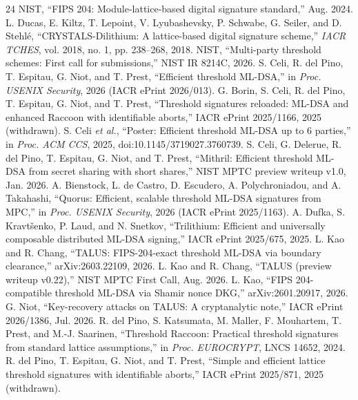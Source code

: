 \documentclass[10pt,conference,a4paper]{IEEEtran}
\begin{document}
\begin{thebibliography}{24}\footnotesize
{} NIST, ``FIPS 204: Module-lattice-based digital signature standard,'' Aug. 2024.
 L. Ducas, E. Kiltz, T. Lepoint, V. Lyubashevsky, P. Schwabe, G. Seiler, and D. Stehl\'e, ``CRYSTALS-Dilithium: A lattice-based digital signature scheme,'' \emph{IACR TCHES}, vol. 2018, no. 1, pp. 238--268, 2018.
 NIST, ``Multi-party threshold schemes: First call for submissions,'' NIST IR 8214C, 2026.
 S. Celi, R. del Pino, T. Espitau, G. Niot, and T. Prest, ``Efficient threshold ML-DSA,'' in \emph{Proc. USENIX Security}, 2026 (IACR ePrint 2026/013).
 G. Borin, S. Celi, R. del Pino, T. Espitau, G. Niot, and T. Prest, ``Threshold signatures reloaded: ML-DSA and enhanced Raccoon with identifiable aborts,'' IACR ePrint 2025/1166, 2025 (withdrawn).
 S. Celi \emph{et al.}, ``Poster: Efficient threshold ML-DSA up to 6 parties,'' in \emph{Proc. ACM CCS}, 2025, doi:10.1145/3719027.3760739.
 S. Celi, G. Delerue, R. del Pino, T. Espitau, G. Niot, and T. Prest, ``Mithril: Efficient threshold ML-DSA from secret sharing with short shares,'' NIST MPTC preview writeup v1.0, Jan. 2026.
 A. Bienstock, L. de Castro, D. Escudero, A. Polychroniadou, and A. Takahashi, ``Quorus: Efficient, scalable threshold ML-DSA signatures from MPC,'' in \emph{Proc. USENIX Security}, 2026 (IACR ePrint 2025/1163).
 A. Dufka, S. Kravt\v{s}enko, P. Laud, and N. Snetkov, ``Trilithium: Efficient and universally composable distributed ML-DSA signing,'' IACR ePrint 2025/675, 2025.
 L. Kao and R. Chang, ``TALUS: FIPS-204-exact threshold ML-DSA via boundary clearance,'' arXiv:2603.22109, 2026.
 L. Kao and R. Chang, ``TALUS (preview writeup v0.22),'' NIST MPTC First Call, Aug. 2026.
 L. Kao, ``FIPS 204-compatible threshold ML-DSA via Shamir nonce DKG,'' arXiv:2601.20917, 2026.
 G. Niot, ``Key-recovery attacks on TALUS: A cryptanalytic note,'' IACR ePrint 2026/1386, Jul. 2026.
 R. del Pino, S. Katsumata, M. Maller, F. Mouhartem, T. Prest, and M.-J. Saarinen, ``Threshold Raccoon: Practical threshold signatures from standard lattice assumptions,'' in \emph{Proc. EUROCRYPT}, LNCS 14652, 2024.
 R. del Pino, T. Espitau, G. Niot, and T. Prest, ``Simple and efficient lattice threshold signatures with identifiable aborts,'' IACR ePrint 2025/871, 2025 (withdrawn).

\end{thebibliography}
\end{document}
